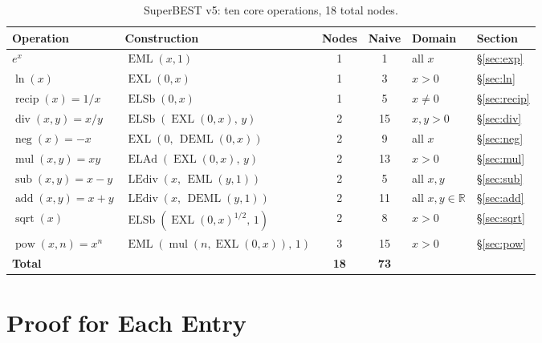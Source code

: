 \documentclass[12pt,a4paper]{article}
\theoremstyle{definition}
\newcommand{\EML}{\operatorname{EML}}
\newcommand{\EXL}{\operatorname{EXL}}
\newcommand{\DEML}{\operatorname{DEML}}
\newcommand{\ELAd}{\operatorname{ELAd}}
\newcommand{\ELSb}{\operatorname{ELSb}}
\newcommand{\LEdiv}{\operatorname{LEdiv}}
\newcommand{\recip}{\operatorname{recip}}
\newcommand{\divop}{\operatorname{div}}
\newcommand{\mulop}{\operatorname{mul}}
\newcommand{\subop}{\operatorname{sub}}
\newcommand{\addop}{\operatorname{add}}
\newcommand{\negop}{\operatorname{neg}}
\newcommand{\powop}{\operatorname{pow}}
\newcommand{\sqrtop}{\operatorname{sqrt}}
\newcommand{\R}{\mathbb{R}}
\begin{document}
\begin{table}[h]
\centering
\caption{SuperBEST v5: ten core operations, 18 total nodes.}
\label{tab:v5}
\smallskip
\begin{tabular}{@{}llccll@{}}
\toprule
\textbf{Operation} & \textbf{Construction} & \textbf{Nodes} & \textbf{Naive} & \textbf{Domain} & \textbf{Section} \\
\midrule
$e^x$             & $\EML(x,1)$                            & 1  &  1 & all $x$        & \S\ref{sec:exp} \\
$\ln(x)$          & $\EXL(0,x)$                            & 1  &  3 & $x>0$          & \S\ref{sec:ln} \\
$\recip(x)=1/x$   & $\ELSb(0,x)$                           & 1  &  5 & $x\ne 0$       & \S\ref{sec:recip} \\
$\divop(x,y)=x/y$ & $\ELSb(\EXL(0,x),\,y)$                & 2  & 15 & $x,y>0$        & \S\ref{sec:div} \\
$\negop(x)=-x$    & $\EXL(0,\,\DEML(0,x))$                & 2  &  9 & all $x$        & \S\ref{sec:neg} \\
$\mulop(x,y)=xy$  & $\ELAd(\EXL(0,x),\,y)$                & 2  & 13 & $x>0$          & \S\ref{sec:mul} \\
$\subop(x,y)=x-y$ & $\LEdiv(x,\,\EML(y,1))$               & 2  &  5 & all $x,y$      & \S\ref{sec:sub} \\
$\addop(x,y)=x+y$ & $\LEdiv(x,\,\DEML(y,1))$              & 2  & 11 & all $x,y\in\R$ & \S\ref{sec:add} \\
$\sqrtop(x)$      & $\ELSb(\EXL(0,x)^{1/2},\,1)$          & 2  &  8 & $x>0$          & \S\ref{sec:sqrt} \\
$\powop(x,n)=x^n$ & $\EML(\mulop(n,\EXL(0,x)),\,1)$       & 3  & 15 & $x>0$          & \S\ref{sec:pow} \\
\midrule
\textbf{Total}    &                                         & \textbf{18} & \textbf{73} & & \\
\bottomrule
\end{tabular}
\smallskip

\end{table}

\section{Proof for Each Entry}
\label{sec:proofs}
\end{document}
